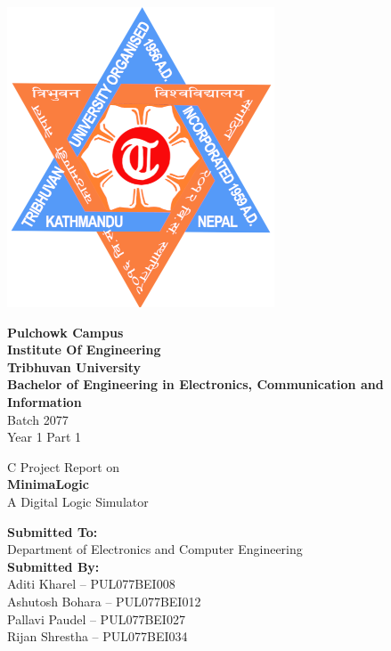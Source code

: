 \documentclass[main.tex]{subfiles}
\begin{document}
    \begin{titlepage}
        \begin{center}
            \includegraphics[width=0.22\linewidth]{graphics/TU-logo.png}\\[0.5cm]
            \begin{large}
                \textbf{Pulchowk Campus\\
                Institute Of Engineering\\
                Tribhuvan University\\[0.5cm]}
                \textbf{Bachelor of Engineering in Electronics, Communication and Information}\\
                Batch 2077\\Year 1 Part 1\\[1.5cm]
            \end{large}
            \large{C Project Report on\\}
            \Huge{\textbf{MinimaLogic}\\}
            \large{A Digital Logic Simulator\\[2cm]}
            \begin{large}
                \textbf{Submitted To:}\\
                {\Large Department of Electronics and Computer Engineering\\[1cm]}
                \textbf{Submitted By:}\\
                Aditi Kharel – PUL077BEI008\\
                Ashutosh Bohara – PUL077BEI012\\
                Pallavi Paudel – PUL077BEI027\\
                Rijan Shrestha – PUL077BEI034\\
            \end{large}
        \end{center}
    \end{titlepage}
\end{document}

